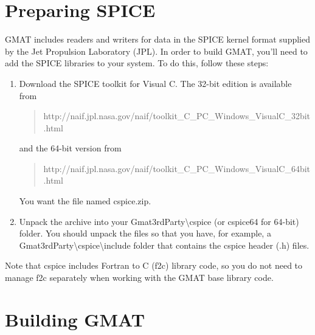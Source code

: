 \documentclass[letterpaper,10pt]{article}%
\begin{document}
{\section{Preparing SPICE}

GMAT includes readers and writers for data in the SPICE kernel format supplied by the Jet Propulsion Laboratory (JPL).  In order to build GMAT, you'll need to add the SPICE libraries to your system.  To do this, follow these steps:

\begin{enumerate}
\item Download the SPICE toolkit for Visual C.  The 32-bit edition is available from
\begin{quote}
http://naif.jpl.nasa.gov/naif/toolkit\_C\_PC\_Windows\_VisualC\_32bit.html
\end{quote}
\noindent and the 64-bit version from
\begin{quote}
http://naif.jpl.nasa.gov/naif/toolkit\_C\_PC\_Windows\_VisualC\_64bit.html
\end{quote}
\noindent You want the file named cspice.zip.
\item Unpack the archive into your Gmat3rdParty\textbackslash cspice (or cspice64 for 64-bit) folder.  You should unpack the files so that you have, for example, a Gmat3rdParty\textbackslash cspice\textbackslash include folder that contains the cspice header (.h) files.
\end{enumerate}

\noindent Note that cspice includes Fortran to C (f2c) library code, so you do not need to manage f2c separately when working with the GMAT base library code.

\section{Building GMAT}

}
\end{document}

